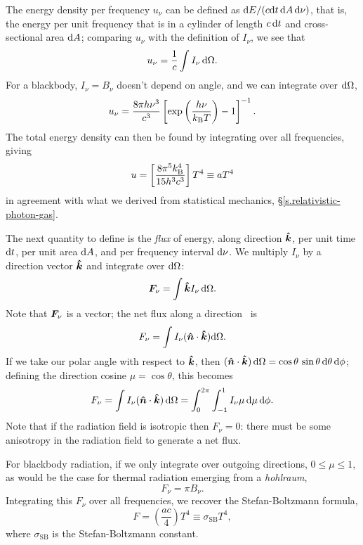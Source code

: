 The energy density per frequency $u_{\nu}$ can be defined as $\mathrm{d} E/(c \mathrm{d} t\,\mathrm{d} A\,\mathrm{d}\nu)$, that is, the energy per unit frequency that is in a cylinder of length $c\,\mathrm{d} t$ and cross-sectional area $\mathrm{d} A$; comparing $u_{\nu}$ with the definition of $I_{\nu}$, we see that
\[
u_{\nu} = \frac{1}{c}\int I_{\nu}\,\mathrm{d}\Omega .
\]
For a blackbody, $I_{\nu}=B_{\nu}$ doesn't depend on angle, and we can integrate over $\mathrm{d}\Omega$,
\begin{equation}\label{e.radiation-energy-density}
u_{\nu}= \frac{8\pi h\nu^{3}}{c^{3}}\left[\exp\left(\frac{h\nu}{k_\mathrm{B} T}\right)-1\right]^{-1}.
\end{equation}
The total energy density can then be found by integrating over all frequencies, giving
\[ u = \left[\frac{8\pi^{5}k_\mathrm{B}^{4}}{15 h^{3}c^{3}}\right] T^{4}\equiv aT^{4} \]
in agreement with what we derived from statistical mechanics, \S\ref{s.relativistic-photon-gas}.

The next quantity to define is the \emph{flux} of energy, along direction $\bm{\hat{k}}$, per unit time $\mathrm{d} t$,  per unit area $\mathrm{d} A$, and per frequency interval $\mathrm{d}\nu$. We multiply $I_{\nu}$ by a direction vector $\bm{\hat{k}}$ and integrate over $\mathrm{d}\Omega$:
\begin{equation}\label{e.radiation-flux}
\bm{F}_{\nu} = \int \bm{\hat{k}} I_{\nu} \,\mathrm{d}\Omega.
\end{equation}
Note that $\bm{F}_{\nu}$ is a vector;  the net flux along a direction \unitn\ is
\[ F_{\nu} = \int I_{\nu}(\bm{\hat{n}}\cdot\bm{\hat{k}})\mathrm{d}\Omega. \]
If we take our polar angle with respect to $\bm{\hat{k}}$, then $(\bm{\hat{n}}\cdot\bm{\hat{k}})\,\mathrm{d}\Omega = \cos\theta\,\sin\theta\,\mathrm{d}\theta\,\mathrm{d} \phi$; defining the direction cosine $\mu = \cos\theta$, this becomes 
\[ F_{\nu} = \int I_{\nu} (\bm{\hat{n}}\cdot\bm{\hat{k}})\,\mathrm{d}\Omega = \int_{0}^{2\pi} \int_{-1}^{1} I_{\nu}\mu\,\mathrm{d}\mu\,\mathrm{d}\phi. \]
Note that if the radiation field is isotropic then $F_{\nu}=0$: there must be some anisotropy in the radiation field to generate a net flux.

For blackbody radiation, if we only integrate over outgoing directions, $0\le \mu\le 1$, as would be the case for thermal radiation emerging from a \emph{hohlraum},
\[ F_{\nu} = \pi B_{\nu}.\]
Integrating this $F_{\nu}$ over all frequencies, we recover the Stefan-Boltzmann formula,
\[ F = \left(\frac{ac}{4}\right) T^{4} \equiv \sigma_{\mathrm{SB}} T^{4}, \]
where $\sigma_{\mathrm{SB}}$ is the Stefan-Boltzmann constant.

